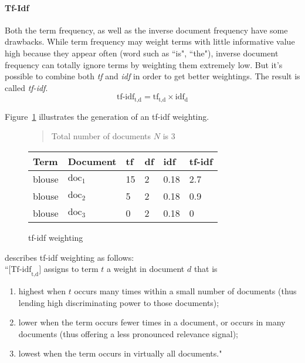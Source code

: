 \paragraph{Tf-Idf}
\label{sec:tfidf}
Both the term frequency, as well as the inverse document frequency have some drawbacks.
While term frequency may weight terms with little informative value high because they appear often (word such as ``is", ``the"), inverse document frequency can totally ignore terms by weighting them extremely low.
But it's possible to combine both \textit{tf} and \textit{idf} in order to get better weightings.
The result is called \textit{tf-idf}.\citep[p.~118-119]{manning:2009}
\begin{equation}
    \text{tf-idf}_{\text{t,d}} = \text{tf}_\text{t,d} \times \text{idf}_\text{d}
    \label{eq:tf-idf-forumula}
\end{equation}

\noindent
Figure~\ref{fig:tfidfweighting} illustrates the generation of an tf-idf weighting.
\begin{figure}[h]

    \begin{quote}
        Total number of documents $N$ is 3\\
    \end{quote}

    \center
    \begin{tabular}{ l l | l l l l }
        \rowcolor{\dustRowHead}
        Term                    & Document          & tf    & df & idf   & tf-idf\\\hline
        blouse                  & $\text{doc}_1$    & 15    &  2 & 0.18  & 2.7\\
        blouse                  & $\text{doc}_2$    & 5     &  2 & 0.18  & 0.9\\
        blouse                  & $\text{doc}_3$    & 0     &  2 & 0.18  & 0\\
    \end{tabular}
    \caption{tf-idf weighting}
    \label{fig:tfidfweighting}
\end{figure}

\noindent
\citeauthor{manning:2009} describes tf-idf weighting as follows:\\
``$\text{[Tf-idf}_{\text{t,d}}\text{]}$ assigns to term $t$ a weight in document $d$ that is
\begin{enumerate}
    \item highest when $t$ occurs many times within a small number of documents
    (thus lending high discriminating power to those documents);
    \item lower when the term occurs fewer times in a document, or occurs in many
    documents (thus offering a less pronounced relevance signal);
    \item lowest when the term occurs in virtually all documents."
\end{enumerate}
\citep[p.~119]{manning:2009}

